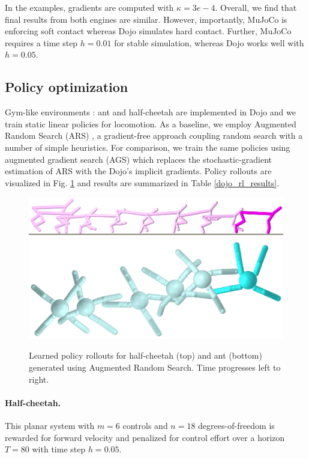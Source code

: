 In the examples, gradients are computed with $\kappa = 3e{-}4$. Overall, we find that final results from both engines are similar. However, importantly, MuJoCo is enforcing soft contact whereas Dojo simulates hard contact. Further, MuJoCo requires a time step $h = 0.01$ for stable simulation, whereas Dojo works well with $h = 0.05$. 

\subsection{Policy optimization}

Gym-like environments \cite{brockman2016openai, duan2016benchmarking}: ant and half-cheetah are implemented in Dojo and we train static linear policies for locomotion. As a baseline, we employ Augmented Random Search (ARS) \cite{mania2018simple}, a gradient-free approach coupling random search with a number of simple heuristics. For comparison, we train the same policies using augmented gradient search (AGS) which replaces the stochastic-gradient estimation of ARS with the Dojo's implicit gradients. Policy rollouts are visualized in Fig. \ref{dojo_rl_vis} and results are summarized in Table \ref{dojo_rl_results}.

\begin{figure}[H]
	\begin{center}
		\includegraphics[width=0.5\columnwidth]{dojo/halfcheetah_ars.png}
		\includegraphics[width=0.5\columnwidth]{dojo/ant_ars.png}
	\end{center}
	\caption[Learned policy rollouts for half-cheetah and ant]{Learned policy rollouts for half-cheetah (top) and ant (bottom) generated using Augmented Random Search. Time progresses left to right.}
	\label{dojo_rl_vis}
\end{figure}

\paragraph{Half-cheetah.}
This planar system \cite{brockman2016openai} with $m = 6$ controls and $n = 18$ degrees-of-freedom is rewarded for forward velocity and penalized for control effort over a horizon $T = 80$ with time step $h = 0.05$. 

